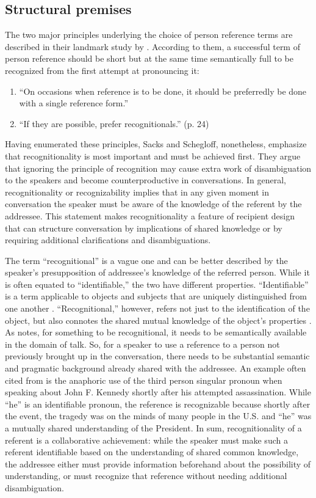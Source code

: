 \documentclass[12pt, draft]{article}
\begin{document}
\subsection{Structural premises}
The two major principles underlying the choice of person reference terms are described in their landmark study by \textcite{sacks1979}. According to them, a successful term of person reference should be short but at the same time semantically full to be recognized from the first attempt at pronouncing it:
\begin{enumerate}
\item ``On occasions when reference is to be done, it should be preferredly be done with a single reference form.''
\item ``If they are possible, prefer recognitionals.'' (p. 24)
\end{enumerate}
Having enumerated these principles, Sacks and Schegloff, nonetheless, emphasize that recognitionality is most important and must be achieved first. They argue that ignoring the principle of recognition may cause extra work of disambiguation to the speakers and become counterproductive in conversations. In general, recognitionality or recognizability implies that in any given moment in conversation the speaker must be aware of the knowledge of the referent by the addressee. This statement makes recognitionality a feature of recipient design that can structure conversation by implications of shared knowledge or by requiring additional clarifications and disambiguations. 

The term ``recognitional'' is a vague one and can be better described by the speaker's presupposition of addressee's knowledge of the referred person. While it is often equated to ``identifiable,'' the two have different properties. ``Identifiable'' is a term applicable to objects and subjects that are uniquely distinguished from one another \parencite{clark1986, chafe1976}. ``Recognitional,'' however, refers not just to the identification of the object, but also connotes the shared mutual knowledge of the object's properties \parencite{clark1986, defornel1987, sacks1979}. As \textcite{chafe1976} notes, for something to be recognitional, it needs to be semantically available in the domain of talk. So, for a speaker to use a reference to a person not previously brought up in the conversation, there needs to be substantial semantic and pragmatic background already shared with the addressee. An example often cited from \textcite{schegloff2007} is the anaphoric use of the third person singular pronoun when speaking about John F. Kennedy shortly after his attempted assassination. While ``he'' is an identifiable pronoun, the reference is recognizable because shortly after the event, the tragedy was on the minds of many people in the U.S. and ``he'' was a mutually shared understanding of the President. In sum, recognitionality of a referent is a collaborative achievement: while the speaker must make such a referent identifiable based on the understanding of shared common knowledge, the addressee either must provide information beforehand about the possibility of understanding, or must recognize that reference without needing additional disambiguation.
\end{document}

